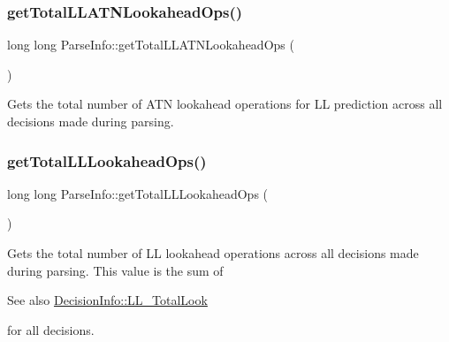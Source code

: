 \subsubsection{\texorpdfstring{get\+Total\+L\+L\+A\+T\+N\+Lookahead\+Ops()}{getTotalLLATNLookaheadOps()}}
{\footnotesize\ttfamily long long Parse\+Info\+::get\+Total\+L\+L\+A\+T\+N\+Lookahead\+Ops (\begin{DoxyParamCaption}{ }\end{DoxyParamCaption})\hspace{0.3cm}{\ttfamily [virtual]}}



Gets the total number of A\+TN lookahead operations for LL prediction across all decisions made during parsing. 

\mbox{\label{classantlr4_1_1atn_1_1ParseInfo_ae5e5cadb9cf4df3fff49583f0c46afc4}} 
\subsubsection{\texorpdfstring{get\+Total\+L\+L\+Lookahead\+Ops()}{getTotalLLLookaheadOps()}}
{\footnotesize\ttfamily long long Parse\+Info\+::get\+Total\+L\+L\+Lookahead\+Ops (\begin{DoxyParamCaption}{ }\end{DoxyParamCaption})\hspace{0.3cm}{\ttfamily [virtual]}}



Gets the total number of LL lookahead operations across all decisions made during parsing. This value is the sum of \begin{DoxySeeAlso}{See also}
\hyperlink{classantlr4_1_1atn_1_1DecisionInfo_a74ee8e588415c652036556738bdd2a04}{Decision\+Info\+::\+L\+L\+\_\+\+Total\+Look}


\end{DoxySeeAlso}
for all decisions. 

\mbox{\label{classantlr4_1_1atn_1_1ParseInfo_a0d67b72cf3de480e3b2142711568129e}} 
